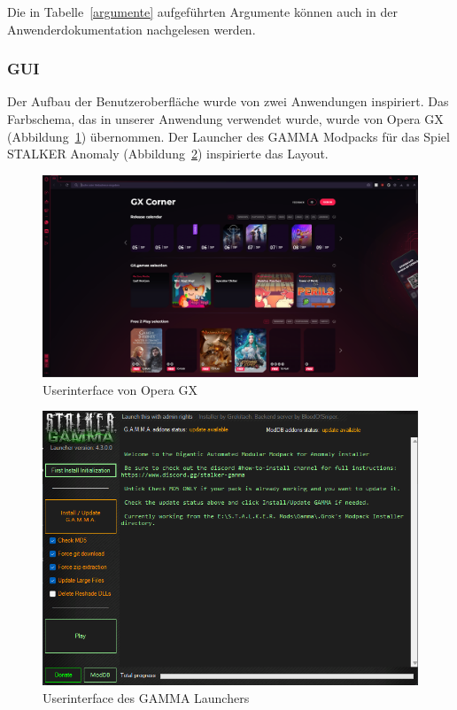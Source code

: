 \documentclass[stu, a4paper, 11pt, floatsintext]{apa7}
\begin{document}
\noindent Die in Tabelle~\ref{argumente} aufgeführten Argumente können auch in der Anwenderdokumentation nachgelesen werden.

\subsubsection{GUI}
\noindent Der Aufbau der Benutzeroberfläche wurde von zwei Anwendungen inspiriert.
Das Farbschema, das in unserer Anwendung verwendet wurde, wurde von Opera GX (Abbildung~\ref{opera}) übernommen. Der Launcher des GAMMA Modpacks für das Spiel STALKER Anomaly (Abbildung~\ref{gamma}) inspirierte das Layout.

\begin{figure}[!htbp]
\centering
\includegraphics[width=450px]{../technical_documentation/gui_sketches/inspiration/opera.png}
\caption{\label{opera}Userinterface von Opera GX}
\end{figure}

\begin{figure}[!htbp]
\centering
\includegraphics[width=450px]{../technical_documentation/gui_sketches/inspiration/gamma.png}
\caption{\label{gamma}Userinterface des GAMMA Launchers}
\end{figure}
\end{document}
